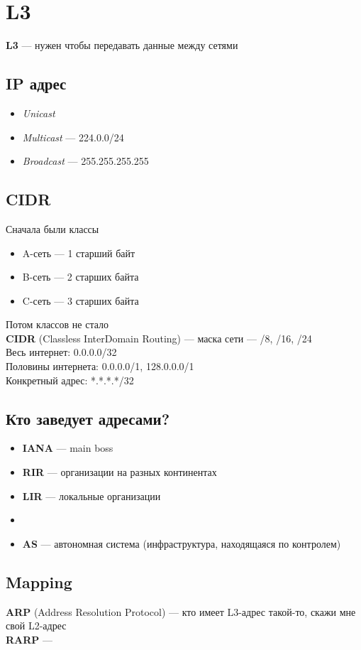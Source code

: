\documentclass[../../lectures.tex]{subfiles}
\begin{document}
\section{L3}
\textbf{L3} --- нужен чтобы передавать данные между сетями

\subsection{IP адрес}
\begin{itemize}
    \item \emph{Unicast}
    \item \emph{Multicast} --- 224.0.0/24
    \item \emph{Broadcast} --- 255.255.255.255
\end{itemize}

\subsection{CIDR}
Сначала были классы
\begin{itemize}
    \item A-сеть --- 1 старший байт
    \item B-сеть --- 2 старших байта
    \item C-сеть --- 3 старших байта
\end{itemize}
Потом классов не стало\\
\textbf{CIDR} (Classless InterDomain Routing) --- маска сети --- /8, /16, /24\\
Весь интернет: 0.0.0.0/32\\
Половины интернета: 0.0.0.0/1, 128.0.0.0/1\\
Конкретный адрес: *.*.*.*/32

\subsection{Кто заведует адресами?}
\begin{itemize}
    \item \textbf{IANA} --- main boss
    \item \textbf{RIR} --- организации на разных континентах
    \item \textbf{LIR} --- локальные организации
    \item {}
    \item \textbf{AS} --- автономная система (инфраструктура, находящаяся по контролем)
\end{itemize}

\subsection{Mapping}
\textbf{ARP} (Address Resolution Protocol) --- кто имеет L3-адрес такой-то, скажи мне свой L2-адрес\\
\textbf{RARP} --- 
\end{document}
